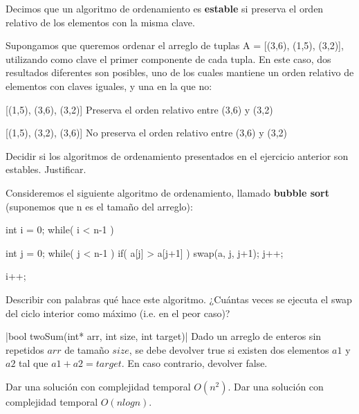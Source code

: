 \documentclass[titlepage,oneside]{book}
\begin{document}
\begin{Exercise}
Decimos que un algoritmo de ordenamiento es \textbf{estable} si preserva el orden relativo de los elementos con la misma clave. \newline

    Supongamos que queremos ordenar el arreglo de tuplas A = [(3,6), (1,5), (3,2)], utilizando como clave el primer componente de cada tupla. En este caso, dos resultados diferentes son posibles, uno de los cuales mantiene un orden relativo de elementos con claves iguales, y una en la que no:


    [(1,5), (3,6), (3,2)] \textcolor{highlightgreen}{Preserva el orden relativo entre (3,6) y (3,2)}

    [(1,5), (3,2), (3,6)] \textcolor{highlightred}{No preserva el orden relativo entre (3,6) y (3,2)}

    \Question Decidir si los algoritmos de ordenamiento presentados en el ejercicio anterior son estables. Justificar.
\end{Exercise}

\begin{Exercise}
	Consideremos el siguiente algoritmo de ordenamiento, llamado \textbf{bubble sort} (suponemos que n es el tamaño del arreglo):

    \begin{ccode}
    int i = 0;
    while( i < n-1 )
    {
        int j = 0;
        while( j < n-1 )
        {
            if( a[j] > a[j+1] )
                swap(a, j, j+1);
            j++;
        }

        i++;
    }
    \end{ccode}

    \Question Describir con palabras qué hace este algoritmo.
    \Question ¿Cuántas veces se ejecuta el swap del ciclo interior como máximo (i.e. en el peor caso)?
\end{Exercise}

\begin{Exercise}
	|bool twoSum(int* arr, int size, int target)|
    Dado un arreglo de enteros sin repetidos $arr$ de tamaño $size$, se debe devolver true si existen dos elementos $a1$ y $a2$ tal que $a1 + a2 = target$. En caso contrario, devolver false.

	\Question Dar una solución con complejidad temporal $O(n^2)$.
    \Question Dar una solución con complejidad temporal $O(n logn)$.

\end{Exercise}
\end{document}
